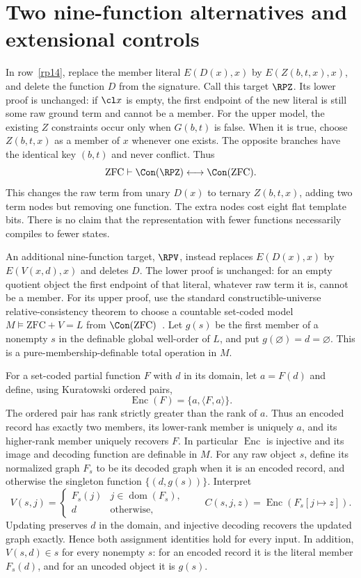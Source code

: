 \section{Two nine-function alternatives and extensional controls}

In row~\ref{rp14}, replace the member literal $E(D(x),x)$ by
$E(Z(b,t,x),x)$, and delete the function $D$ from the signature.
Call this target $\RPZ$. Its lower proof is unchanged: if $\cl x$
is empty, the first endpoint of the new literal is still some raw
ground term and cannot be a member. For the upper model, the existing
$Z$ constraints occur only when $G(b,t)$ is false. When it is true,
choose $Z(b,t,x)$ as a member of $x$ whenever one exists. The opposite
branches have the identical key $(b,t)$ and never conflict. Thus
\[
 \mathrm{ZFC}\vdash\Con(\RPZ)\longleftrightarrow\Con(\mathrm{ZFC}).
\]
This changes the raw term from unary $D(x)$ to ternary $Z(b,t,x)$,
adding two term nodes but removing one function. The extra nodes cost
eight flat template bits. There is no claim that the representation
with fewer functions necessarily compiles to fewer states.

An additional nine-function target, $\RPV$, instead replaces
$E(D(x),x)$ by $E(V(x,d),x)$ and deletes $D$. The lower proof is
unchanged: for an empty quotient object the first endpoint of that
literal, whatever raw term it is, cannot be a member. For its upper
proof, use the standard constructible-universe relative-consistency
theorem to choose a countable set-coded model
$M\models\mathrm{ZFC}+V=L$ from $\Con(\mathrm{ZFC})$~\cite{godel1938}.
Let $g(s)$ be the first member of a nonempty $s$ in the definable global
well-order of $L$, and put $g(\varnothing)=d=\varnothing$. This is a
pure-membership-definable total operation in $M$.

For a set-coded partial function $F$ with $d$ in its domain, let
$a=F(d)$ and define, using Kuratowski ordered pairs,
\[
 \operatorname{Enc}(F)=\{a,\langle F,a\rangle\}.
\]
The ordered pair has rank strictly greater than the rank of $a$.
Thus an encoded record has exactly two members, its lower-rank member
is uniquely $a$, and its higher-rank member uniquely recovers $F$.
In particular $\operatorname{Enc}$ is injective and its image and
decoding function are definable in $M$. For any raw object $s$, define
its normalized graph $F_s$ to be its decoded graph when it is an encoded
record, and otherwise the singleton function $\{(d,g(s))\}$.
Interpret
\[
 V(s,j)=\begin{cases}F_s(j)&j\in\operatorname{dom}(F_s),\\d&\text{otherwise},\end{cases}
 \qquad
 C(s,j,z)=\operatorname{Enc}(F_s[j\mapsto z]).
\]
Updating preserves $d$ in the domain, and injective decoding recovers
the updated graph exactly. Hence both assignment identities hold for
every input. In addition, $V(s,d)\in s$ for every nonempty $s$:
for an encoded record it is the literal member $F_s(d)$, and for an
uncoded object it is $g(s)$.

